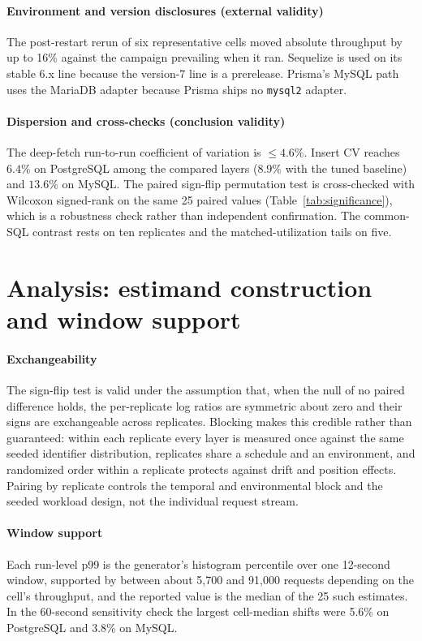 \documentclass[11pt,a4paper]{article}
\begin{document}
\paragraph{Environment and version disclosures (external validity)} The post-restart rerun of six
representative cells moved absolute throughput by up to 16\% against the campaign prevailing when it
ran. Sequelize is used on its stable 6.x line because the version-7 line is a prerelease. Prisma's
MySQL path uses the MariaDB adapter because Prisma ships no \texttt{mysql2} adapter.

\paragraph{Dispersion and cross-checks (conclusion validity)} The deep-fetch run-to-run coefficient
of variation is $\leq4.6\%$. Insert CV reaches $6.4\%$ on PostgreSQL among the compared layers
($8.9\%$ with the tuned baseline) and $13.6\%$ on MySQL. The paired sign-flip permutation test is
cross-checked with Wilcoxon signed-rank on the same 25 paired values
(Table~\ref{tab:significance}), which is a robustness check rather than independent
confirmation. The common-SQL contrast rests on ten replicates and the matched-utilization tails on
five.

\section{Analysis: estimand construction and window support}
\label{sup:analysis-construction}
\paragraph{Exchangeability} The sign-flip test is valid under the assumption that, when the null of
no paired difference holds, the per-replicate log ratios are symmetric about zero and their signs are
exchangeable across replicates. Blocking makes this credible rather than guaranteed: within each
replicate every layer is measured once against the same seeded identifier distribution, replicates
share a schedule and an environment, and randomized order within a replicate protects against drift
and position effects. Pairing by replicate controls the temporal and environmental block and the
seeded workload design, not the individual request stream.

\paragraph{Window support} Each run-level p99 is the generator's histogram percentile over one
12-second window, supported by between about 5{,}700 and 91{,}000 requests depending on the cell's
throughput, and the reported value is the median of the 25 such estimates. In the 60-second
sensitivity check the largest cell-median shifts were 5.6\% on PostgreSQL and 3.8\% on MySQL.
\end{document}
